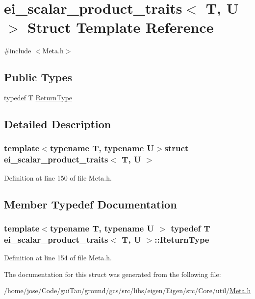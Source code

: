 \hypertarget{structei__scalar__product__traits}{\section{ei\-\_\-scalar\-\_\-product\-\_\-traits$<$ T, U $>$ Struct Template Reference}
\label{structei__scalar__product__traits}
}


{\ttfamily \#include $<$Meta.\-h$>$}

\subsection*{Public Types}
\begin{DoxyCompactItemize}
\item 
typedef T \hyperlink{structei__scalar__product__traits_acc27459d1eacfbd8fad52bba1c8afb9e}{Return\-Type}
\end{DoxyCompactItemize}


\subsection{Detailed Description}
\subsubsection*{template$<$typename T, typename U$>$struct ei\-\_\-scalar\-\_\-product\-\_\-traits$<$ T, U $>$}



Definition at line 150 of file Meta.\-h.



\subsection{Member Typedef Documentation}
\hypertarget{structei__scalar__product__traits_acc27459d1eacfbd8fad52bba1c8afb9e}{
\subsubsection[{Return\-Type}]{\setlength{\rightskip}{0pt plus 5cm}template$<$typename T, typename U $>$ typedef T {\bf ei\-\_\-scalar\-\_\-product\-\_\-traits}$<$ T, U $>$\-::{\bf Return\-Type}}}\label{structei__scalar__product__traits_acc27459d1eacfbd8fad52bba1c8afb9e}


Definition at line 154 of file Meta.\-h.



The documentation for this struct was generated from the following file\-:\begin{DoxyCompactItemize}
\item 
/home/jose/\-Code/gui\-Tau/ground/gcs/src/libs/eigen/\-Eigen/src/\-Core/util/\hyperlink{_meta_8h}{Meta.\-h}\end{DoxyCompactItemize}
